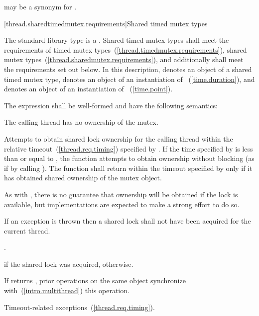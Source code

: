 \pnum
{} may be a synonym for .

[thread.sharedtimedmutex.requirements]{Shared timed mutex types}

\pnum
The standard library type  is a
. Shared timed mutex types shall meet the requirements of
timed mutex types~(\ref{thread.timedmutex.requirements}),
shared mutex types~(\ref{thread.sharedmutex.requirements}), and additionally
shall meet the requirements set out below. In this description,
 denotes an object of a shared timed mutex type,
 denotes an object of an instantiation of
~(\ref{time.duration}), and
 denotes an object of an instantiation of
~(\ref{time.point}).

\pnum
The expression  shall be well-formed and
have the following semantics:

\begin{itemdescr}
\pnum
\requires The calling thread has no ownership of the mutex.

\pnum
\effects Attempts to obtain
shared lock ownership for the calling thread within the relative
timeout~(\ref{thread.req.timing}) specified by . If the time
specified by  is less than or equal to ,
the function attempts to obtain ownership without blocking (as if by calling
). The function shall return within the timeout
specified by  only if it has obtained shared ownership of the
mutex object. \begin{note} As with , there is no guarantee that
ownership will be obtained if the lock is available, but implementations are
expected to make a strong effort to do so. \end{note}
If an exception is thrown then a shared lock shall not have been acquired for
the current thread.

\pnum
\returntype {}.

\pnum
\returns {} if the shared lock was acquired,  otherwise.

\pnum
\sync If  returns , prior
 operations on the same object synchronize
with~(\ref{intro.multithread}) this operation.

\pnum
\throws Timeout-related exceptions~(\ref{thread.req.timing}).
\end{itemdescr}

